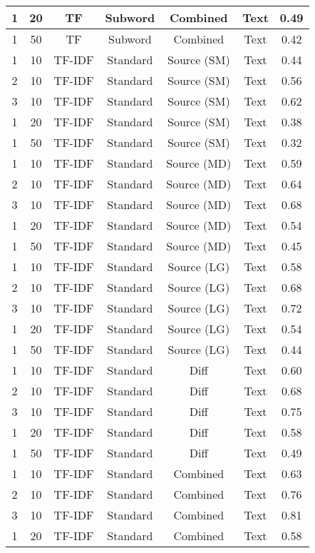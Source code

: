 \begin{longtable}{|c|c|c|c|c|c|c|}
\hline
1 & 20 & TF & Subword & Combined & Text & 0.49 \\
\hline
1 & 50 & TF & Subword & Combined & Text & 0.42 \\
\hline
1 & 10 & TF-IDF & Standard & Source (SM) & Text & 0.44 \\
\hline
2 & 10 & TF-IDF & Standard & Source (SM) & Text & 0.56 \\
\hline
3 & 10 & TF-IDF & Standard & Source (SM) & Text & 0.62 \\
\hline
1 & 20 & TF-IDF & Standard & Source (SM) & Text & 0.38 \\
\hline
1 & 50 & TF-IDF & Standard & Source (SM) & Text & 0.32 \\
\hline
1 & 10 & TF-IDF & Standard & Source (MD) & Text & 0.59 \\
\hline
2 & 10 & TF-IDF & Standard & Source (MD) & Text & 0.64 \\
\hline
3 & 10 & TF-IDF & Standard & Source (MD) & Text & 0.68 \\
\hline
1 & 20 & TF-IDF & Standard & Source (MD) & Text & 0.54 \\
\hline
1 & 50 & TF-IDF & Standard & Source (MD) & Text & 0.45 \\
\hline
1 & 10 & TF-IDF & Standard & Source (LG) & Text & 0.58 \\
\hline
2 & 10 & TF-IDF & Standard & Source (LG) & Text & 0.68 \\
\hline
3 & 10 & TF-IDF & Standard & Source (LG) & Text & 0.72 \\
\hline
1 & 20 & TF-IDF & Standard & Source (LG) & Text & 0.54 \\
\hline
1 & 50 & TF-IDF & Standard & Source (LG) & Text & 0.44 \\
\hline
1 & 10 & TF-IDF & Standard & Diff & Text & 0.60 \\
\hline
2 & 10 & TF-IDF & Standard & Diff & Text & 0.68 \\
\hline
3 & 10 & TF-IDF & Standard & Diff & Text & 0.75 \\
\hline
1 & 20 & TF-IDF & Standard & Diff & Text & 0.58 \\
\hline
1 & 50 & TF-IDF & Standard & Diff & Text & 0.49 \\
\hline
1 & 10 & TF-IDF & Standard & Combined & Text & 0.63 \\
\hline
2 & 10 & TF-IDF & Standard & Combined & Text & 0.76 \\
\hline
3 & 10 & TF-IDF & Standard & Combined & Text & 0.81 \\
\hline
1 & 20 & TF-IDF & Standard & Combined & Text & 0.58 \\

\end{longtable}
